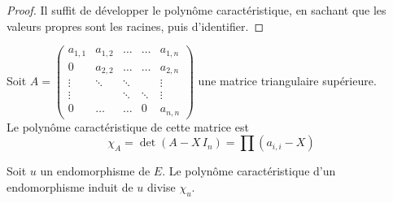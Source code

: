\documentclass[11pt,a4paper,fleqn,pdftex]{report}
\begin{document}
\begin{proof}
     Il suffit de développer le polynôme caractéristique, en sachant que les valeurs propres sont les racines, puis d'identifier.
\end{proof}
\begin{theorem}
     Soit $A=\begin{pmatrix}
a_{1,1} & a_{1,2} & \ldots & \ldots & a_{1,n} \\
0       & a_{2,2} & \ldots & \ldots & a_{2,n} \\
\vdots  & \ddots  & \ddots &        & \vdots  \\
\vdots  &         & \ddots & \ddots & \vdots  \\
0       & \ldots  & \ldots & 0       & a_{n,n}
\end{pmatrix}$ une matrice triangulaire supérieure.\\[0.6\baselineskip]
Le polynôme caractéristique de cette matrice est 
\begin{equation}
\chi_A = \det (A - X\, I_n) = \prod (a_{i,i} - X)
\end{equation}
\end{theorem}
\begin{theorem}
     Soit $u$ un endomorphisme de $E$. Le polynôme caractéristique d'un endomorphisme induit de $u$ divise $\chi_u$.
\end{theorem}
\end{document}
